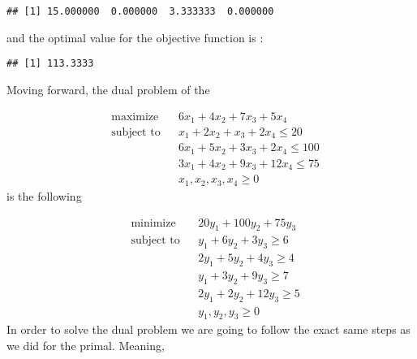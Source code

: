 \documentclass[
]{article}
\newenvironment{Shaded}{\begin{snugshade}}{\end{snugshade}}
\newcommand{\NormalTok}[1]{#1}
\newcommand{\SpecialCharTok}[1]{\textcolor[rgb]{0.00,0.00,0.00}{#1}}
\begin{document}
\begin{verbatim}
## [1] 15.000000  0.000000  3.333333  0.000000
\end{verbatim}

and the optimal value for the objective function is :

\begin{Shaded}
\end{Shaded}

\begin{verbatim}
## [1] 113.3333
\end{verbatim}

Moving forward, the dual problem of the

\[
\begin{aligned}
& \text{maximize}
& & 6x_1 +4x_2 +7x_3 +5x_4 \\
& \text{subject to}
& & x_1 +2x_2 + x_3 +2x_4 \leq 20 \\
&&& 6x_1 +5x_2 +3x_3 +2x_4 \leq 100 \\
&&& 3x_1 +4x_2 +9x_3 +12x_4 \leq 75 \\
&&& x_1,x_2,x_3,x_4 \geq 0
\end{aligned}
\] is the following

\[
\begin{aligned}
& \text{minimize}
& & 20y_1 + 100y_2 +75y_3 \\
& \text{subject to}
& & y_1 + 6y_2 + 3y_3  \geq 6 \\
&&& 2y_1 + 5y_2 + 4y_3 \geq 4 \\
&&& y_1 + 3y_2 + 9y_3 \geq 7 \\
&&& 2y_1 + 2y_2 + 12y_3 \geq 5 \\
&&& y_1,y_2,y_3 \geq 0
\end{aligned}
\] In order to solve the dual problem we are going to follow the exact
same steps as we did for the primal. Meaning,
\end{document}
